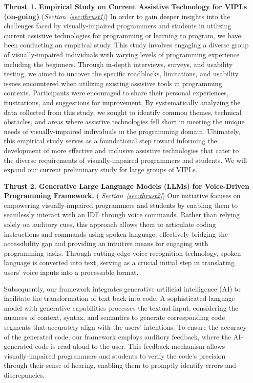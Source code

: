 \vspace{3pt}
\noindent \textbf{Thrust 1. Empirical Study on Current Assistive
  Technology for VIPLs (on-going)} ({\em Section~\ref{sec:thrust1}})
In order to gain deeper insights into the challenges faced by
visually-impaired programmers and students in utilizing current
assistive technologies for programming or learning to program, we have
been conducting an empirical study. This study involves engaging a
diverse group of visually-impaired individuals with varying levels of
programming experience including the beginners. Through in-depth
interviews, surveys, and usability testing, we aimed to uncover the
specific roadblocks, limitations, and usability issues encountered
when utilizing existing assistive tools in programming
contexts. Participants were encouraged to share their personal
experiences, frustrations, and suggestions for improvement. By
systematically analyzing the data collected from this study, we sought
to identify common themes, technical obstacles, and areas where
assistive technologies fell short in meeting the unique needs of
visually-impaired individuals in the programming domain. Ultimately,
this empirical study serves as a foundational step toward informing
the development of more effective and inclusive assistive technologies
that cater to the diverse requirements of visually-impaired
programmers and students. We will expand our current preliminary study
for large groups of VIPLs.

\noindent \textbf{Thrust 2. Generative Large Language Models (LLMs)
  for Voice-Driven Programming Framework.}  ({\em
  Section~\ref{sec:thrust2}}) Our initiative focuses on empowering
visually-impaired programmers and students by enabling them to
seamlessly interact with an IDE through voice commands. Rather than
relying solely on auditory cues, this approach allows them to
articulate coding instructions and commands using spoken language,
effectively bridging the accessibility gap and providing an intuitive
means for engaging with programming tasks. Through cutting-edge voice
recognition technology, spoken language is converted into text,
serving as a crucial initial step in translating users' voice inputs
into a processable format.

Subsequently, our framework integrates generative artificial
intelligence (AI) to facilitate the transformation of text back into
code. A sophisticated language model with generative capabilities
processes the textual input, considering the nuances of context,
syntax, and semantics to generate corresponding code segments that
accurately align with the users' intentions. To ensure the accuracy of
the generated code, our framework employs auditory feedback, where the
AI-generated code is read aloud to the user. This feedback mechanism
allows visually-impaired programmers and students to verify the code's
precision through their sense of hearing, enabling them to promptly
identify errors and discrepancies.

